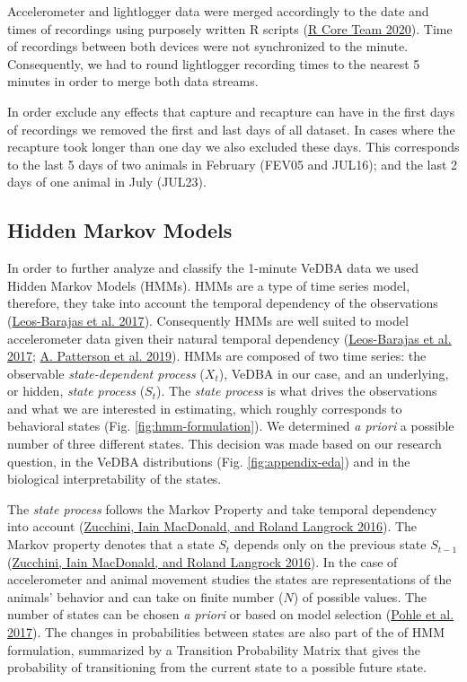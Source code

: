 \documentclass[english,msc,numbers,hidelinks]{coppe}
\begin{document}
  Accelerometer and lightlogger data were merged accordingly to the date and times of recordings using purposely written R scripts (\protect\hyperlink{ref-rcoreteam2020}{R Core Team 2020}). Time of recordings between both devices were not synchronized to the minute. Consequently, we had to round lightlogger recording times to the nearest 5 minutes in order to merge both data streams.

  In order exclude any effects that capture and recapture can have in the first days of recordings we removed the first and last days of all dataset. In cases where the recapture took longer than one day we also excluded these days. This corresponds to the last 5 days of two animals in February (FEV05 and JUL16); and the last 2 days of one animal in July (JUL23).

  \hypertarget{hidden-markov-models}{%
  \subsection{Hidden Markov Models}\label{hidden-markov-models}}

  In order to further analyze and classify the 1-minute VeDBA data we used Hidden Markov Models (HMMs). HMMs are a type of time series model, therefore, they take into account the temporal dependency of the observations (\protect\hyperlink{ref-leosbarajas2017}{Leos-Barajas et al. 2017}). Consequently HMMs are well suited to model accelerometer data given their natural temporal dependency (\protect\hyperlink{ref-leosbarajas2017}{Leos-Barajas et al. 2017}; \protect\hyperlink{ref-patterson2019}{A. Patterson et al. 2019}). HMMs are composed of two time series: the observable \emph{state-dependent process} (\(X_t\)), VeDBA in our case, and an underlying, or hidden, \emph{state process} (\(S_t\)). The \emph{state process} is what drives the observations and what we are interested in estimating, which roughly corresponds to behavioral states (Fig. \ref{fig:hmm-formulation}). We determined \emph{a priori} a possible number of three different states. This decision was made based on our research question, in the VeDBA distributions (Fig. \ref{fig:appendix-eda}) and in the biological interpretability of the states.

  The \emph{state process} follows the Markov Property and take temporal dependency into account (\protect\hyperlink{ref-zucchini2016}{Zucchini, Iain MacDonald, and Roland Langrock 2016}). The Markov property denotes that a state \(S_t\) depends only on the previous state \(S_{t-1}\) (\protect\hyperlink{ref-zucchini2016}{Zucchini, Iain MacDonald, and Roland Langrock 2016}). In the case of accelerometer and animal movement studies the states are representations of the animals' behavior and can take on finite number (\(N\)) of possible values. The number of states can be chosen \emph{a priori} or based on model selection (\protect\hyperlink{ref-pohle2017}{Pohle et al. 2017}). The changes in probabilities between states are also part of the of HMM formulation, summarized by a Transition Probability Matrix that gives the probability of transitioning from the current state to a possible future state.
\end{document}
